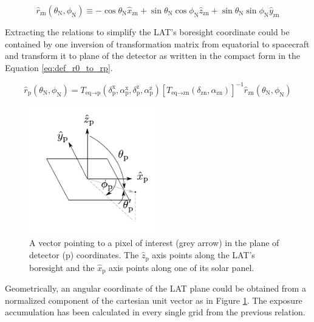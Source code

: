 \begin{equation}
    \hat{r}_\text{zn} (\theta_\text{N}, \phi_\text{N}) \equiv -\cos\theta_\text{N}\hat{x}_\text{zn} + \sin\theta_\text{N}\cos\phi_\text{N}\hat{z}_\text{zn} + \sin\theta_\text{N}\sin\phi_\text{N}\hat{y}_\text{zn}
    \label{eq:def_r0}
\end{equation}

Extracting the relations to simplify the 
LAT's boresight coordinate could be contained by one inversion of 
transformation matrix from equatorial to spacecraft and transform it 
to plane of the detector as written in the compact form in the Equation 
\ref{eq:def_r0_to_rp}.

\begin{equation}
    \hat{r}_\text{p} (\theta_\text{N}, \phi_\text{N}) = T_{\text{eq}\rightarrow\text{p}} (\delta^\text{x}_\text{p}, \alpha^\text{x}_\text{p}, \delta^\text{z}_\text{p}, \alpha^\text{z}_\text{p}) \left[T_{\text{eq}\rightarrow\text{zn}} (\delta_\text{zn}, \alpha_\text{zn})\right]^{-1} \hat{r}_\text{zn} (\theta_\text{N}, \phi_\text{N})
    \label{eq:def_r0_to_rp}
\end{equation}

\begin{figure}[h!]
    \centering
    \includegraphics[width=0.5\textwidth]{content/methodology/figures/coord_plane}
    \caption{
        A vector pointing to a pixel of interest (grey arrow)
        in the plane of detector (p) coordinates.
        The $\hat{z}_\text{p}$ axis
        points along the LAT's boresight
        and the $\hat{x}_\text{p}$ axis
        points along one of its solar panel.
    }
    \label{fig:tf_lat_pol_car}
\end{figure}

Geometrically, an angular coordinate of the LAT plane could be obtained from
a normalized component of the cartesian unit vector as in Figure
\ref{fig:tf_lat_pol_car}. The exposure accumulation has been
calculated in every single grid from the previous relation.

